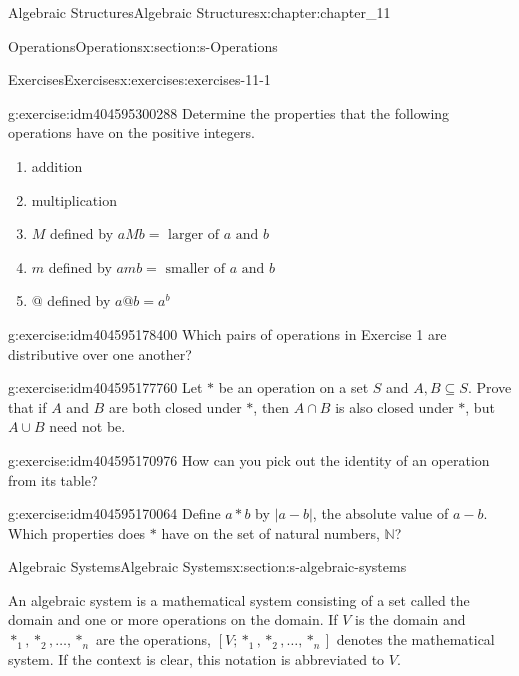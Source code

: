 \documentclass[twoside,10pt,]{book}
\numberwithin{equation}{section}
\begin{document}
\begin{chapterptx}{Algebraic Structures}{}{Algebraic Structures}{}{}{x:chapter:chapter_11}
\begin{sectionptx}{Operations}{}{Operations}{}{}{x:section:s-Operations}
\begin{exercises-subsection}{Exercises}{}{Exercises}{}{}{x:exercises:exercises-11-1}
\begin{divisionexercise}{1}{}{}{g:exercise:idm404595300288}%
Determine the properties that the following operations have on the positive integers.%
\begin{enumerate}[label=(\alph*)]
\item{}addition%
\item{}multiplication%
\item{}\(M\) defined by \(a M b = \textrm{ larger} \textrm{ of } a \textrm{ and } b\)%
\item{}\(m\) defined by \(a m b = \textrm{ smaller} \textrm{ of } a \textrm{ and } b\)%
\item{}\(@\) defined by \(a @ b = a^b\)%
\end{enumerate}
%
\end{divisionexercise}%
\begin{divisionexercise}{2}{}{}{g:exercise:idm404595178400}%
Which pairs of operations in Exercise 1 are distributive over one another?%
\end{divisionexercise}%
\begin{divisionexercise}{3}{}{}{g:exercise:idm404595177760}%
Let \(*\) be an operation on a set \(S\) and \(A, B \subseteq S\). Prove that if \(A\) and \(B\) are both closed under \(*\), then \(A\cap B\) is also closed under \(*\), but \(A \cup  B\) need not be.%
\end{divisionexercise}%
\begin{divisionexercise}{4}{}{}{g:exercise:idm404595170976}%
How can you pick out the identity of an operation from its table?%
\end{divisionexercise}%
\begin{divisionexercise}{5}{}{}{g:exercise:idm404595170064}%
Define \(a * b\) by \(\lvert a - b \rvert\), the absolute value of \(a - b\). Which properties does \(*\) have on the set of natural numbers, \(\mathbb{N}\)?%
\end{divisionexercise}%
\end{exercises-subsection}
\end{sectionptx}
%
%
\typeout{************************************************}
\typeout{************************************************}
%
\begin{sectionptx}{Algebraic Systems}{}{Algebraic Systems}{}{}{x:section:s-algebraic-systems}
%
\begin{introduction}{}%
An algebraic system is a mathematical system consisting of a set called the domain and one or more operations on the domain. If \(V\) is the domain and \(*_1, *_2, \ldots , *_n\) are the operations, \(\left[V;*_1, *_2, \ldots , *_n\right]\) denotes the mathematical system. If the context is clear, this notation is abbreviated to \(V\).%

\end{introduction}
\end{sectionptx}
\end{chapterptx}
\end{document}
